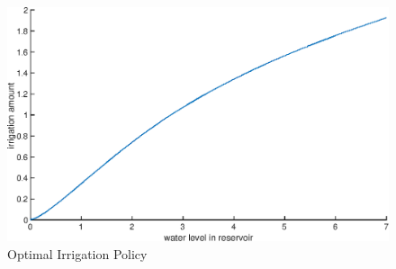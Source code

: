\documentclass[12pt, a4paper, oneside]{article}
\begin{document}
\begin{figure}[ht]
	\includegraphics[width=1\textwidth]{figures/OptimalIrrigationPolicy.eps}
	\caption{Optimal Irrigation Policy}
	\label{fig:optimal-irrigation-policy}
\end{figure}
\newpage
\end{document}
